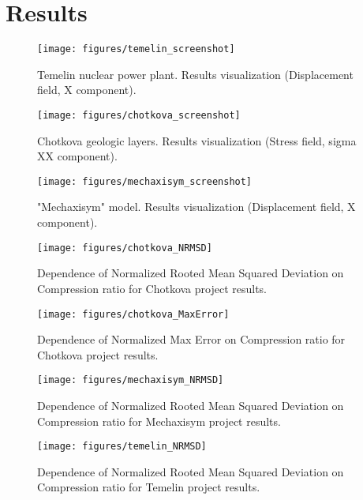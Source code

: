 \section{Results}
\label{sec:results}

\begin{figure}[ht]
\centering\texttt{[image: figures/temelin\_screenshot]}
\caption{Temelin nuclear power plant. Results visualization (Displacement field, X component).}
\label{fig:temelin:mesh}
\end{figure}

\begin{figure}[ht]
\centering\texttt{[image: figures/chotkova\_screenshot]}
\caption{Chotkova geologic layers. Results visualization (Stress field, sigma XX component).}
\label{fig:chotkova:mesh}
\end{figure}

\begin{figure}[ht]
\centering\texttt{[image: figures/mechaxisym\_screenshot]}
\caption{"Mechaxisym" model. Results visualization (Displacement field, X component).}
\label{fig:mechaxisym:mesh}
\end{figure}

\begin{figure}[ht]
\centering\texttt{[image: figures/chotkova\_NRMSD]}
\caption{Dependence of Normalized Rooted Mean Squared Deviation on Compression ratio for Chotkova project results.}
\label{fig:chotkova:NRMSD}
\end{figure}

\begin{figure}[ht]
\centering\texttt{[image: figures/chotkova\_MaxError]}
\caption{Dependence of Normalized Max Error on Compression ratio for Chotkova project results.}
\label{fig:chotkova:MaxError}
\end{figure}

\begin{figure}[ht]
\centering\texttt{[image: figures/mechaxisym\_NRMSD]}
\caption{Dependence of Normalized Rooted Mean Squared Deviation on Compression ratio for Mechaxisym project results.}
\label{fig:mechaxisym:NRMSD}
\end{figure}

\begin{figure}[ht]
\centering\texttt{[image: figures/temelin\_NRMSD]}
\caption{Dependence of Normalized Rooted Mean Squared Deviation on Compression ratio for Temelin project results.}
\label{fig:temelin:NRMSD}
\end{figure}

